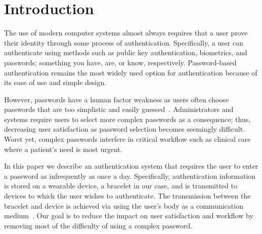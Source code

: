 \documentclass[runningheads,a4paper]{llncs}
\begin{document}
\section{Introduction}\label{sec:intro}
The use of modern computer systems almost always requires that a user prove their identity through some process of authentication.  Specifically, a user can authenticate using methods such as public key authentication, biometrics, and passwords; something you have, are, or know, respectively.  Password-based authentication remains the most widely used option for authentication because of its ease of use and simple design. %


However, passwords have a human factor weakness as users often choose passwords that are too simplistic and easily guessed~\cite{Yan:2004:PMS:1024867.1025014}.  Administrators and systems require users to select more complex passwords as a consequence; thus, decreasing user satisfaction as password selection becomes seemingly difficult. Worst yet, complex passwords interfere in critical workflow such as clinical care where a patient's need is most urgent.  

In this paper we describe an authentication system that requires the user to enter a password as infrequently as once a day.  Specifically, authentication information is stored on a wearable device, a bracelet in our case, and is transmitted to devices to which the user wishes to authenticate. The transmission between the bracelet and device is achieved via using the user's body as a communication medium~\cite{Barth:2008:BCB:1460257.1460273,chang:healthtech:2013}. Our goal is to reduce the impact on user satisfaction and workflow by removing most of the difficulty of using a complex password. 
\end{document}
